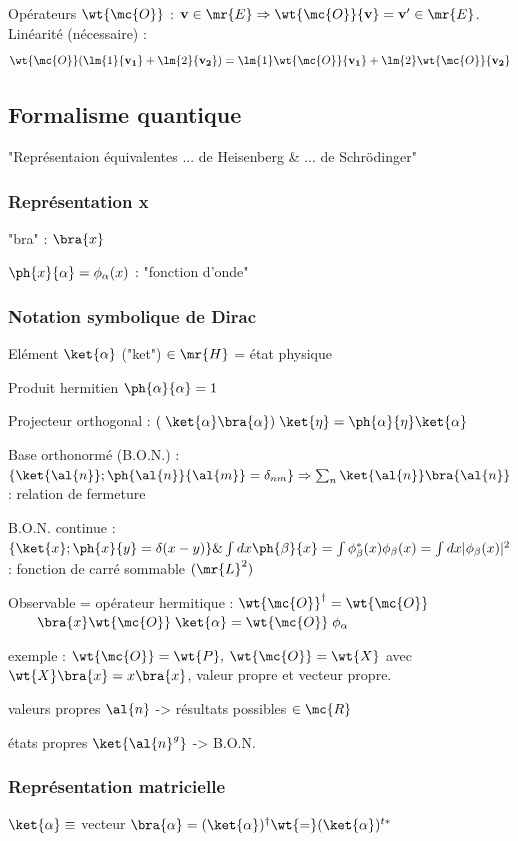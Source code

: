 Opérateurs $\wt{\mc{O}}$ : ${\bf v}\in\mr{E} \Rightarrow
\wt{\mc{O}}{\bf v}={\bf v'}\in\mr{E}$. Linéarité (nécessaire) : 
\[\wt{\mc{O}} (\lm{1}{\bf v_1}+\lm{2}{\bf v_2}) = 
\lm{1}\wt{\mc{O}}{\bf v_1}+\lm{2}\wt{\mc{O}}{\bf v_2}  
\]

\subsection{Formalisme quantique}
"Représentaion équivalentes ... de Heisenberg \& ... de Schrödinger"
\subsubsection{Représentation x}
"bra" : $\bra{x}$

$\ph{x}{\alpha}=\phi_\alpha(x)$ : "fonction d'onde"

\subsubsection{Notation symbolique de Dirac }

Elément $\ket{\alpha}$ ("ket") $\in \mr{H}$ = état physique

Produit hermitien $\ph{\alpha}{\alpha}=1$

Projecteur orthogonal : $(\;\ket{\alpha}\bra{\alpha})\;\ket{\eta}=
\ph{\alpha}{\eta}\ket{\alpha}$

Base orthonormé (B.O.N.) : $\{\ket{\al{n}};\ph{\al{n}}{\al{m}}=\delta_{nm}\}\Rightarrow
\sum_n\ket{\al{n}}\bra{\al{n}}$ : relation de fermeture

B.O.N. continue : $\{\ket{x};\ph{x}{y}=\delta(x-y)\} \&
\int dx\ph{\beta}{x} = \int \phi_\beta^*(x)\phi_\beta(x)=
\int dx|\phi_\beta(x)|^2$ : fonction de carré sommable $(\mr{L}^2)$

Observable = opérateur hermitique : $\wt{\mc{O}}^\dagger=\wt{\mc{O}}$
$\qquad \bra{x}\wt{\mc{O}}\;\ket{\alpha}=\wt{\mc{O}}\;\phi_\alpha$

exemple : $\wt{\mc{O}}=\wt{P},$ $\wt{\mc{O}}=\wt{X}$ avec
$\wt{X}\bra{x}=x\bra{x}$, valeur propre et vecteur propre.

valeurs propres $\al{n}$ -> résultats possibles $\in \mc{R}$

états propres $\ket{\al{n}^g}$ -> B.O.N.

\subsubsection{Représentation matricielle}
$\ket{\alpha}\equiv$ vecteur \qquad $\bra{\alpha}=(\ket{\alpha})^\dagger\wt{=}
(\ket{\alpha})^{t*}$

